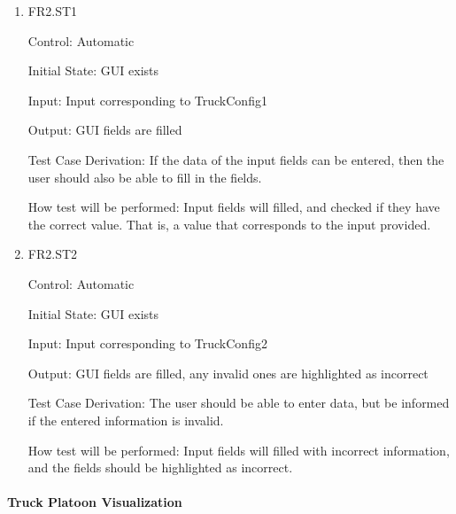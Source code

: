 \documentclass[12pt, titlepage]{article}
\begin{document}
\begin{enumerate}

  \item{FR2.ST1\\}

  Control: Automatic

  Initial State: GUI exists

  Input: Input corresponding to TruckConfig1

  Output: GUI fields are filled

  Test Case Derivation: If the data of the input fields can be entered, then the user
  should also be able to fill in the fields.

  How test will be performed: Input fields will filled, and checked if they have the
  correct value. That is, a value that corresponds to the input provided.

  \item{FR2.ST2\\}

  Control: Automatic

  Initial State: GUI exists

  Input: Input corresponding to TruckConfig2

  Output: GUI fields are filled, any invalid ones are highlighted as incorrect

  Test Case Derivation: The user should be able to enter data, but be informed if the
  entered information is invalid.

  How test will be performed: Input fields will filled with incorrect information, 
  and the fields should be highlighted as incorrect.

\end{enumerate}

\paragraph{Truck Platoon Visualization}
\end{document}

